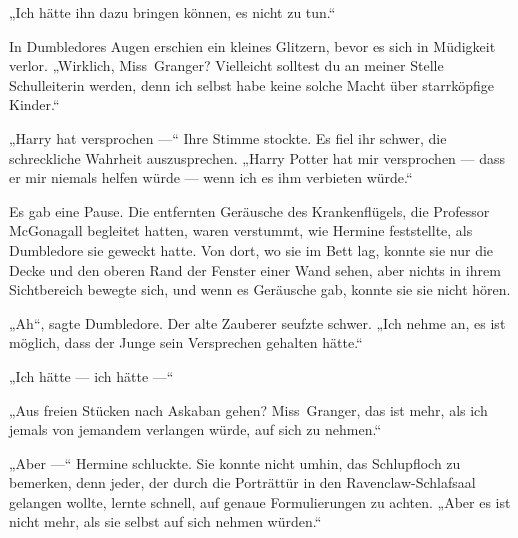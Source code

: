 „Ich hätte ihn dazu bringen können, es nicht zu tun.“

In Dumbledores Augen erschien ein kleines Glitzern, bevor es sich in Müdigkeit verlor.
„Wirklich, Miss~Granger? Vielleicht solltest du an meiner Stelle Schulleiterin werden, denn ich selbst habe keine solche Macht über starrköpfige Kinder.“

„Harry hat versprochen —“ Ihre Stimme stockte. Es fiel ihr schwer, die schreckliche Wahrheit auszusprechen.
„Harry Potter hat mir versprochen — dass er mir niemals helfen würde — wenn ich es ihm verbieten würde.“

Es gab eine Pause. Die entfernten Geräusche des Krankenflügels, die Professor McGonagall begleitet hatten, waren verstummt, wie Hermine feststellte, als Dumbledore sie geweckt hatte. Von dort, wo sie im Bett lag, konnte sie nur die Decke und den oberen Rand der Fenster einer Wand sehen, aber nichts in ihrem Sichtbereich bewegte sich, und wenn es Geräusche gab, konnte sie sie nicht hören.

„Ah“, sagte Dumbledore. Der alte Zauberer seufzte schwer.
„Ich nehme an, es ist möglich, dass der Junge sein Versprechen gehalten hätte.“

„Ich hätte — ich hätte —“

„Aus freien Stücken nach Askaban gehen? Miss~Granger, das ist mehr, als ich jemals von jemandem verlangen würde, auf sich zu nehmen.“

„Aber —“ Hermine schluckte. Sie konnte nicht umhin, das Schlupfloch zu bemerken, denn jeder, der durch die Porträttür in den Ravenclaw-Schlafsaal gelangen wollte, lernte schnell, auf genaue Formulierungen zu achten.
„Aber es ist nicht mehr, als sie selbst auf sich nehmen würden.“

